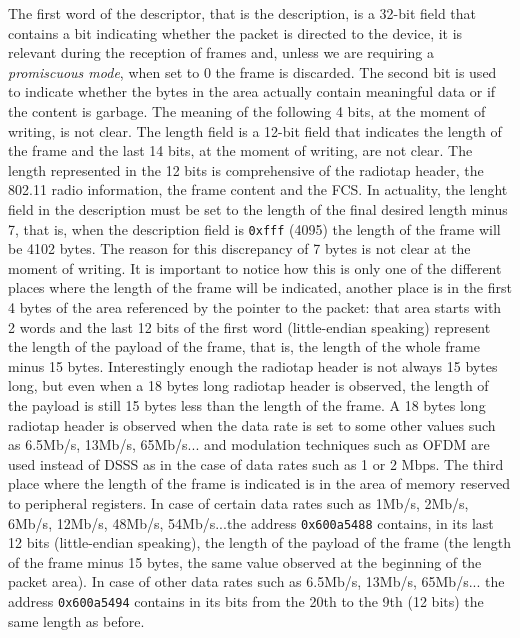 The first word of the descriptor, that is the description, is a 32-bit field 
that contains a bit indicating whether the packet is directed to the device,
it is relevant during the reception of frames and, unless we
are requiring a \textit{promiscuous mode}, when set to 0 the frame is discarded.
The second bit is used to indicate whether the bytes in the area actually contain 
meaningful data or if the content is garbage. The meaning of the following 4 bits, at the moment
of writing, is not clear. 
The length field is a 12-bit field that indicates the length of the frame and the last 14 bits,
at the moment of writing, are not clear.
The length represented in the 12 bits is comprehensive of the radiotap header, 
the 802.11 radio information, the frame content and the FCS.
In actuality, the lenght field in the description must be set to the length of the final desired
length minus 7, that is, when the description field is \texttt{0xfff} (4095) the length of the frame
will be 4102 bytes. The reason for this discrepancy of 7 bytes is not clear at the moment of writing.
It is important to notice how this is only one of the different places where the length of the frame
will be indicated, another place is in the first 4 bytes of the area referenced by the pointer to the packet:
that area starts with 2 words and the last 12 bits of the first word (little-endian speaking)
represent the length of the payload of the frame, that is, the length of the whole frame minus 15 bytes. 
Interestingly enough the radiotap header is not always 15 bytes long, but even when a 18 bytes 
long radiotap header is observed, the length of the payload is still 15 bytes less than the length of the frame.
A 18 bytes long radiotap header is observed when the data rate is set to some other values such as 6.5Mb/s, 13Mb/s, 65Mb/s...
and modulation techniques such as OFDM are used instead of DSSS as in the case of data rates such as 1 or 2 Mbps. 
The third place where the length of the frame is indicated is in the area of memory reserved to
peripheral registers. 
In case of certain data rates 
such as 1Mb/s, 2Mb/s, 6Mb/s, 12Mb/s, 48Mb/s, 54Mb/s...the address \texttt{0x600a5488} contains, in its last 12 bits (little-endian speaking),
the length of the payload of the frame (the length of the frame minus 15 bytes, the same value observed
at the beginning of the packet area).
In case of other data rates such as 6.5Mb/s, 13Mb/s, 65Mb/s... the address 
\texttt{0x600a5494} contains in its bits from the 20th to the 9th (12 bits) the same length as before.

